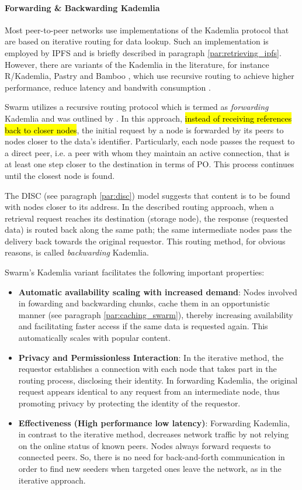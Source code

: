 \paragraph{Forwarding \& Backwarding Kademlia}\label{par:forwarding_kademlia}
Most peer-to-peer networks use implementations of the Kademlia protocol that are based on iterative routing for data lookup. Such an implementation is employed by IPFS and is briefly described in paragraph \ref{par:retrieving_ipfs}. However, there are variants of the Kademlia in the literature, for instance R/Kademlia, Pastry and Bamboo \citep{chowdhury_2017},  which use recursive routing to achieve higher performance, reduce latency and bandwith consumption \citep{heep_2010}.

Swarm utilizes a recursive routing protocol which is termed as \textit{forwarding} Kademlia and was outlined by \cite{tron_2018}. In this approach, \hl{instead of receiving references back to closer nodes}, the initial request by a node is forwarded by its peers to nodes closer to the data's identifier. Particularly, each node passes the request to a direct peer, i.e. a peer with whom they maintain an active connection, that is at least one step closer to the destination in terms of PO. This process continues until the closest node is found.

The DISC (see paragraph \ref{par:disc}) model suggests that content is to be found with nodes closer to its address. In the described routing approach, when a retrieval request reaches its destination (storage node), the response (requested data) is routed back along the same path; the same intermediate nodes pass the delivery back towards the original requestor. This routing method, for obvious reasons, is called \textit{backwarding} Kademlia.

Swarm's Kademlia variant facilitates the following important properties:

\begin{itemize}
    \item \textbf{Automatic availability scaling with increased demand}: Nodes involved in fowarding and backwarding chunks, cache them in an opportunistic manner (see paragraph \ref{par:caching_swarm}), thereby increasing availability and facilitating faster access if the same data is requested again. This automatically scales with popular content. 
    \item \textbf{Privacy and Permissionless Interaction}: In the iterative method, the requestor establishes a connection with each node that takes part in the routing process, disclosing their identity. In forwarding Kademlia, the original request appears identical to any request from an intermediate node, thus promoting privacy by protecting the identity of the requestor.
    \item \textbf{Effectiveness (High performance low latency)}: Forwarding Kademlia, in contrast to the iterative method, decreases network traffic by not relying on the online status of known peers. Nodes always forward requests to connected peers. So, there is no need for back-and-forth communication in order to find new seeders when targeted ones leave the network, as in the iterative approach.
\end{itemize}

